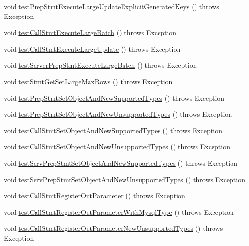 \begin{DoxyCompactItemize}
\item 
void \mbox{\hyperlink{classtestsuite_1_1simple_1_1_statements_test_a05c4ee6dc645d6b2398c83f70f244ae4}{test\+Prep\+Stmt\+Execute\+Large\+Update\+Explicit\+Generated\+Keys}} ()  throws Exception 
\item 
void \mbox{\hyperlink{classtestsuite_1_1simple_1_1_statements_test_aefea78e355a622d7b5b0d79e11878cb7}{test\+Call\+Stmt\+Execute\+Large\+Batch}} ()  throws Exception 
\item 
void \mbox{\hyperlink{classtestsuite_1_1simple_1_1_statements_test_ade0670c0a2b079707bef4b4c243518c3}{test\+Call\+Stmt\+Execute\+Large\+Update}} ()  throws Exception 
\item 
void \mbox{\hyperlink{classtestsuite_1_1simple_1_1_statements_test_a0436c15b990003b15ded434289c66bfa}{test\+Server\+Prep\+Stmt\+Execute\+Large\+Batch}} ()  throws Exception 
\item 
void \mbox{\hyperlink{classtestsuite_1_1simple_1_1_statements_test_a0b4ba896da3713e9f09a7af0ecf64115}{test\+Stmt\+Get\+Set\+Large\+Max\+Rows}} ()  throws Exception 
\item 
void \mbox{\hyperlink{classtestsuite_1_1simple_1_1_statements_test_aca0d1e60c7b8391bcc8af09b79a01389}{test\+Prep\+Stmt\+Set\+Object\+And\+New\+Supported\+Types}} ()  throws Exception 
\item 
void \mbox{\hyperlink{classtestsuite_1_1simple_1_1_statements_test_af83a1d44591aec497316a9a0fa9f33b5}{test\+Prep\+Stmt\+Set\+Object\+And\+New\+Unsupported\+Types}} ()  throws Exception 
\item 
void \mbox{\hyperlink{classtestsuite_1_1simple_1_1_statements_test_aa04ae89ac45c2ba4a727ed8f60149704}{test\+Call\+Stmt\+Set\+Object\+And\+New\+Supported\+Types}} ()  throws Exception 
\item 
void \mbox{\hyperlink{classtestsuite_1_1simple_1_1_statements_test_a000090a9bbfb5c6ff927a25160cb8042}{test\+Call\+Stmt\+Set\+Object\+And\+New\+Unsupported\+Types}} ()  throws Exception 
\item 
void \mbox{\hyperlink{classtestsuite_1_1simple_1_1_statements_test_a80e61653b55e9a6da8f81dc2ac1bce5a}{test\+Serv\+Prep\+Stmt\+Set\+Object\+And\+New\+Supported\+Types}} ()  throws Exception 
\item 
void \mbox{\hyperlink{classtestsuite_1_1simple_1_1_statements_test_a50dc87eaa732e080fb9d391c753c6b49}{test\+Serv\+Prep\+Stmt\+Set\+Object\+And\+New\+Unsupported\+Types}} ()  throws Exception 
\item 
void \mbox{\hyperlink{classtestsuite_1_1simple_1_1_statements_test_ac1ce052f2d7090889dc501304aebccee}{test\+Call\+Stmt\+Register\+Out\+Parameter}} ()  throws Exception 
\item 
void \mbox{\hyperlink{classtestsuite_1_1simple_1_1_statements_test_ae5a084185b03cb13fa2185bf95b513cf}{test\+Call\+Stmt\+Register\+Out\+Parameter\+With\+Mysql\+Type}} ()  throws Exception 
\item 
void \mbox{\hyperlink{classtestsuite_1_1simple_1_1_statements_test_a24c2a4417a85c41519c9cc3143211bdf}{test\+Call\+Stmt\+Register\+Out\+Parameter\+New\+Unsupported\+Types}} ()  throws Exception 
\end{DoxyCompactItemize}

